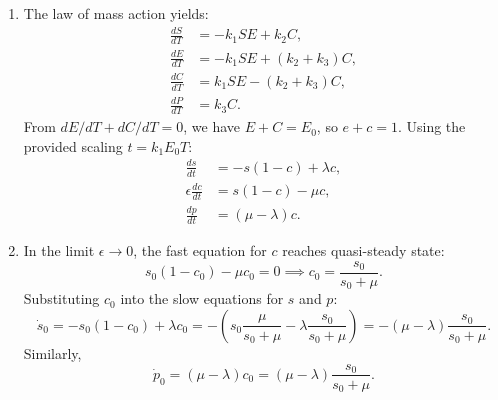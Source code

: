 \begin{solution}
\begin{enumerate}
    \item[(a)] The law of mass action yields:
    \begin{align*}
        \frac{dS}{dT} &= -k_1 SE + k_2 C, \\
        \frac{dE}{dT} &= -k_1 SE + (k_2 + k_3) C, \\
        \frac{dC}{dT} &= k_1 SE - (k_2 + k_3) C, \\
        \frac{dP}{dT} &= k_3 C.
    \end{align*}
    From $dE/dT + dC/dT = 0$, we have $E+C = E_0$, so $e+c=1$. Using the provided scaling $t = k_1 E_0 T$:
    \begin{align*}
        \frac{ds}{dt} &= -s(1-c) + \lambda c, \\
        \epsilon \frac{dc}{dt} &= s(1-c) - \mu c, \\
        \frac{dp}{dt} &= (\mu - \lambda) c.
    \end{align*}
    
    \item[(b)] In the limit $\epsilon \to 0$, the fast equation for $c$ reaches quasi-steady state:
    \[ s_0(1-c_0) - \mu c_0 = 0 \implies c_0 = \frac{s_0}{s_0 + \mu}. \]
    Substituting $c_0$ into the slow equations for $s$ and $p$:
    \[ \dot{s}_0 = -s_0(1-c_0) + \lambda c_0 = - \left( s_0 \frac{\mu}{s_0 + \mu} - \lambda \frac{s_0}{s_0 + \mu} \right) = -(\mu - \lambda) \frac{s_0}{s_0 + \mu}. \]
    Similarly,
    \[ \dot{p}_0 = (\mu - \lambda) c_0 = (\mu - \lambda) \frac{s_0}{s_0 + \mu}. \]
\end{enumerate}
\end{solution}

